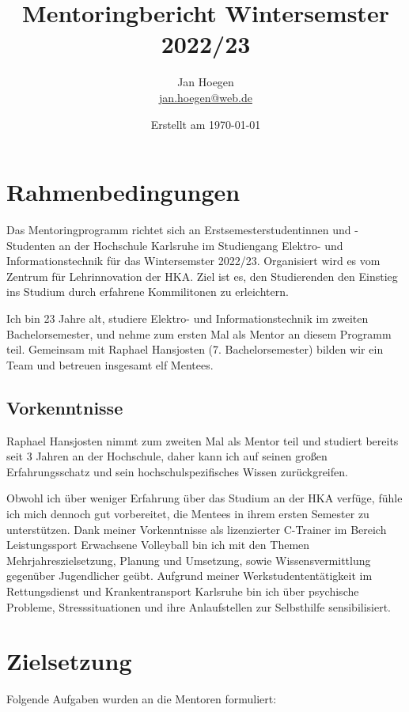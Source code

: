 \documentclass[
    paper=a4,
    div=calc,
    numbers=noendperiod,
]{scrartcl}
\title{Mentoringbericht Wintersemster 2022/23}
\author{Jan Hoegen\\\href{mailto:jan.hoegen@web.de}{jan.hoegen@web.de}}
\date{Erstellt am \today}
\begin{document}
\maketitle

\tableofcontents

\section{Rahmenbedingungen}
    Das Mentoringprogramm richtet sich an Erstsemesterstudentinnen und -Studenten an der Hochschule Karlsruhe im Studiengang Elektro- und Informationstechnik für das Wintersemster 2022/23. Organisiert wird es vom Zentrum für Lehrinnovation der HKA. Ziel ist es, den Studierenden den Einstieg ins Studium durch erfahrene Kommilitonen zu erleichtern.

    Ich bin 23 Jahre alt, studiere Elektro- und Informationstechnik im zweiten Bachelorsemester, und nehme zum ersten Mal als Mentor an diesem Programm teil. Gemeinsam mit Raphael Hansjosten (7. Bachelorsemester) bilden wir ein Team und betreuen insgesamt elf Mentees. 

    \subsection*{Vorkenntnisse}
        Raphael Hansjosten nimmt zum zweiten Mal als Mentor teil und studiert bereits seit 3 Jahren an der Hochschule, daher kann ich auf seinen großen Erfahrungsschatz und sein hochschulspezifisches Wissen zurückgreifen. 

        Obwohl ich über weniger Erfahrung über das Studium an der HKA verfüge, fühle ich mich dennoch gut vorbereitet, die Mentees in ihrem ersten Semester zu unterstützen. Dank meiner Vorkenntnisse als lizenzierter C-Trainer im Bereich Leistungssport Erwachsene Volleyball bin ich mit den Themen Mehrjahreszielsetzung, Planung und Umsetzung, sowie Wissensvermittlung gegenüber Jugendlicher geübt.  
        Aufgrund meiner Werkstudententätigkeit im Rettungsdienst und Krankentransport Karlsruhe bin ich über psychische Probleme, Stresssituationen      und ihre Anlaufstellen zur Selbsthilfe sensibilisiert.  
 
\section{Zielsetzung}
    \label{sec:ziele}
    Folgende Aufgaben wurden an die Mentoren formuliert:
\end{document}
